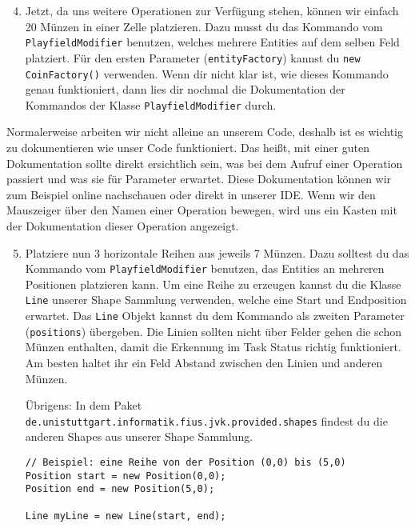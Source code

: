 \begin{enumerate} \setcounter{enumi}{3}
    \item Jetzt, da uns weitere Operationen zur Verfügung stehen, können wir einfach 20 Münzen in einer Zelle platzieren. 
        Dazu musst du das Kommando vom \lstinline{PlayfieldModifier} benutzen, welches mehrere Entities auf dem selben Feld platziert.
        Für den ersten Parameter (\lstinline{entityFactory}) kannst du \lstinline{new CoinFactory()} verwenden. 
        Wenn dir nicht klar ist, wie dieses Kommando genau funktioniert, dann lies dir nochmal die Dokumentation der Kommandos der Klasse \lstinline{PlayfieldModifier} durch.
\end{enumerate}

\begin{Infobox}
    Normalerweise arbeiten wir nicht alleine an unserem Code, deshalb ist es wichtig zu dokumentieren wie unser Code funktioniert. 
    Das heißt, mit einer guten Dokumentation sollte direkt ersichtlich sein, was bei dem Aufruf einer Operation passiert und was sie für Parameter erwartet. 
    Diese Dokumentation können wir zum Beispiel online nachschauen oder direkt in unserer IDE. 
    Wenn wir den Mauszeiger über den Namen einer Operation bewegen, wird uns ein Kasten mit der Dokumentation dieser Operation angezeigt.
\end{Infobox}


\begin{enumerate} \setcounter{enumi}{4}
    \item Platziere nun 3 horizontale Reihen aus jeweils 7 Münzen. 
        Dazu solltest du das Kommando vom \lstinline{PlayfieldModifier} benutzen, das Entities an mehreren Positionen platzieren kann.
        Um eine Reihe zu erzeugen kannst du die Klasse \lstinline{Line} unserer Shape Sammlung verwenden, welche eine Start und Endposition erwartet.
        Das \lstinline{Line} Objekt kannst du dem Kommando als zweiten Parameter (\lstinline{positions}) übergeben.
        Die Linien sollten nicht über Felder gehen die schon Münzen enthalten, damit die Erkennung im Task Status richtig funktioniert.
        Am besten haltet ihr ein Feld Abstand zwischen den Linien und anderen Münzen.

        Übrigens: In dem Paket \texttt{de.unistuttgart.informatik.fius.jvk.provided.shapes} findest du die anderen Shapes aus unserer Shape Sammlung.

    \begin{lstlisting}
// Beispiel: eine Reihe von der Position (0,0) bis (5,0)
Position start = new Position(0,0);
Position end = new Position(5,0);

Line myLine = new Line(start, end);
    \end{lstlisting}

\end{enumerate}
